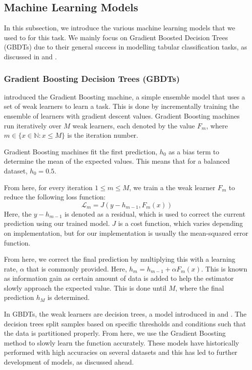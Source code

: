 \documentclass[pdflatex,sn-basic,10pt]{sn-jnl}%
\begin{document}
\subsection{Machine Learning Models}\label{subsec:machine-learning-models}
In this subsection, we introduce the various machine learning models that we used to for this task. We mainly focus on Gradient Boosted Decision Trees (GBDTs) due to their general success in modelling tabular classification tasks, as discussed in \cite{grinsztajn2022tree} and \cite{mcelfresh2023neural}.


\subsubsection{Gradient Boosting Decision Trees (GBDTs)}

\cite{friedman2001greedy} introduced the Gradient Boosting machine, a simple ensemble model that uses a set of weak learners to learn a task. This is done by incrementally training the ensemble of learners with gradient descent values. Gradient Boosting machines run iteratively over $M$ weak learners, each denoted by the value $F_m$, where $m \in \{x\in\mathbb{N}:x\leq M\}$ is the iteration number.

Gradient Boosting machines fit the first prediction, $h_0$ as a bias term to determine the mean of the expected values. This means that for a balanced dataset, $h_0 = 0.5$.

From here, for every iteration $1 \leq m \leq M$, we train a the weak learner $F_m$ to reduce the following loss function:
$$\mathcal{L}_m = J(y-h_{m-1}, F_m(x))$$
Here, the $y-h_{m-1}$ is denoted as a residual, which is used to correct the current prediction using our trained model. $J$ is a cost function, which varies depending on implementation, but for our implementation is usually the mean-squared error function.

From here, we correct the final prediction by multiplying this with a learning rate, $\alpha$ that is commonly provided. Here, $h_m = h_{m-1} + \alpha F_m(x)$. This is known as information gain as certain amount of data is added to help the estimator slowly approach the expected value. This is done until $M$, where the final prediction $h_M$ is determined.

In GBDTs, the weak learners are decision trees, a model introduced in \cite{breiman1984} and \cite{quinlan1986induction}. The decision trees split samples based on specific thresholds and conditions such that the data is partitioned properly. From here, we use the Gradient Boosting method to slowly learn the function accurately. These models have historically performed with high accuracies on several datasets and this has led to further development of models, as discussed ahead.
\end{document}
